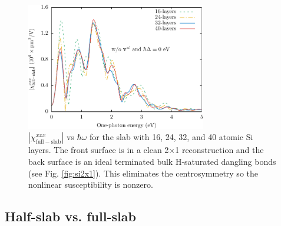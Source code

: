 {\begin{figure}
\centering 
\includegraphics[width=0.7\textwidth]{figures/fig-4_1_02}
\caption{$|\chi_{\mathrm{full-slab}}^{xxx}|$ vs $\hbar\omega$
for the slab with 16, 24, 32, and 40 atomic Si layers. The front surface is in a
clean 2$\times$1 reconstruction and the back surface is an ideal terminated bulk
H-saturated dangling bonds (see Fig. \ref{fig:si2x1}). This eliminates the
centrosymmetry so the nonlinear susceptibility is nonzero.
\label{fig:layersconv}}
\end{figure}



\subsection{Half-slab vs. full-slab}

}
